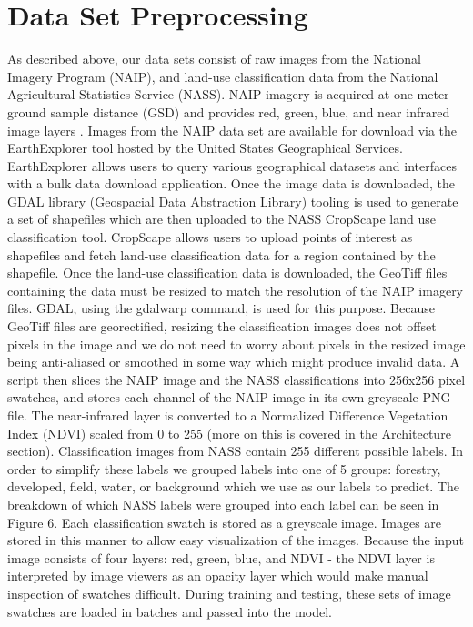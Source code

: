 \documentclass[12pt]{article}
\begin{document}
\section{Data Set Preprocessing}
As described above, our data sets consist of raw images from the National Imagery Program (NAIP), and land-use classification data from the National Agricultural Statistics Service (NASS). NAIP imagery is acquired at one-meter ground sample distance (GSD) and provides red, green, blue, and near infrared image layers \cite{NAIP}. Images from the NAIP data set are available for download via the EarthExplorer tool hosted by the United States Geographical Services. EarthExplorer allows users to query various geographical datasets and interfaces with a bulk data download application. Once the image data is downloaded, the GDAL library (Geospacial Data Abstraction Library) tooling is used to generate a set of shapefiles which are then uploaded to the NASS CropScape land use classification tool. CropScape allows users to upload points of interest as shapefiles and fetch land-use classification data for a region contained by the shapefile. Once the land-use classification data is downloaded, the GeoTiff files containing the data must be resized to match the resolution of the NAIP imagery files. GDAL, using the gdalwarp command, is used for this purpose. Because GeoTiff files are georectified, resizing the classification images does not offset pixels in the image and we do not need to worry about pixels in the resized image being anti-aliased or smoothed in some way which might produce invalid data. A script then slices the NAIP image and the NASS classifications into 256x256 pixel swatches, and stores each channel of the NAIP image in its own greyscale PNG file. The near-infrared layer is converted to a Normalized Difference Vegetation Index (NDVI) scaled from 0 to 255 (more on this is covered in the Architecture section). Classification images from NASS contain 255 different possible labels. In order to simplify these labels we grouped labels into one of 5 groups: forestry, developed, field, water, or background which we use as our labels to predict. The breakdown of which NASS labels were grouped into each label can be seen in Figure 6. Each classification swatch is stored as a greyscale image. Images are stored in this manner to allow easy visualization of the images. Because the input image consists of four layers: red, green, blue, and NDVI - the NDVI layer is interpreted by image viewers as an opacity layer which would make manual inspection of swatches difficult. During training and testing, these sets of image swatches are loaded in batches and passed into the model.
\end{document}
